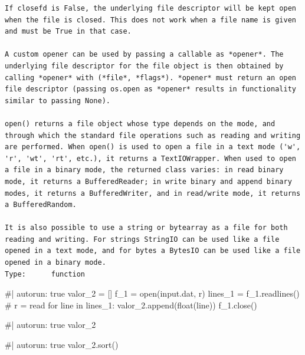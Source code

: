 \documentclass[
  letterpaper,
  DIV=11,
  numbers=noendperiod]{scrreprt}
\newenvironment{Shaded}{\begin{snugshade}}{\end{snugshade}}
\newcommand{\NormalTok}[1]{\textcolor[rgb]{0.00,0.23,0.31}{#1}}
\begin{document}
\begin{verbatim}
If closefd is False, the underlying file descriptor will be kept open
when the file is closed. This does not work when a file name is given
and must be True in that case.

A custom opener can be used by passing a callable as *opener*. The
underlying file descriptor for the file object is then obtained by
calling *opener* with (*file*, *flags*). *opener* must return an open
file descriptor (passing os.open as *opener* results in functionality
similar to passing None).

open() returns a file object whose type depends on the mode, and
through which the standard file operations such as reading and writing
are performed. When open() is used to open a file in a text mode ('w',
'r', 'wt', 'rt', etc.), it returns a TextIOWrapper. When used to open
a file in a binary mode, the returned class varies: in read binary
mode, it returns a BufferedReader; in write binary and append binary
modes, it returns a BufferedWriter, and in read/write mode, it returns
a BufferedRandom.

It is also possible to use a string or bytearray as a file for both
reading and writing. For strings StringIO can be used like a file
opened in a text mode, and for bytes a BytesIO can be used like a file
opened in a binary mode.
Type:      function
\end{verbatim}

\begin{Shaded}
\begin{Highlighting}[]
\NormalTok{\#| autorun: true}
\NormalTok{valor\_2 = []}
\NormalTok{f\_1 = open(\textquotesingle{}input.dat\textquotesingle{}, \textquotesingle{}r\textquotesingle{})}
\NormalTok{lines\_1 = f\_1.readlines()  \# r = read}
\NormalTok{for line in lines\_1:}
\NormalTok{    valor\_2.append(float(line))}
\NormalTok{f\_1.close()}
\end{Highlighting}
\end{Shaded}

\begin{Shaded}
\begin{Highlighting}[]
\NormalTok{\#| autorun: true}
\NormalTok{valor\_2}
\end{Highlighting}
\end{Shaded}

\begin{Shaded}
\begin{Highlighting}[]
\NormalTok{\#| autorun: true}
\NormalTok{valor\_2.sort()}
\end{Highlighting}
\end{Shaded}
\end{document}
